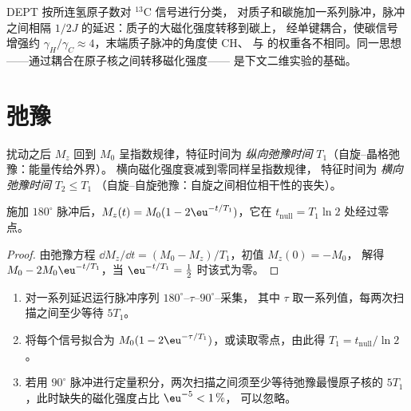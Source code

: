 DEPT 按所连氢原子数对 ${}^{13}$C 信号进行分类，
对质子和碳施加一系列脉冲，脉冲之间相隔
$1/2J$ 的延迟：质子的大磁化强度转移到碳上，
经单键耦合，使碳信号增强约
$\gamma_H/\gamma_C \approx 4$，末端质子脉冲的角度使 CH、 与
 的权重各不相同。同一思想——通过耦合在原子核之间转移磁化强度——
是下文二维实验的基础。

\section{弛豫}

\begin{definition}[纵向与横向弛豫时间]\label{def:b3:advanced-nmr:relaxation}
扰动之后 $M_z$ 回到 $M_0$ 呈指数规律，特征时间为
\emph{纵向弛豫时间} $T_1$（自旋–晶格弛豫：能量传给外界）。
横向磁化强度衰减到零同样呈指数规律，
特征时间为
\emph{横向弛豫时间} $T_2 \le T_1$
（自旋–自旋弛豫：自旋之间相位相干性的丧失）。
\end{definition}

\begin{proposition}[反转恢复]\label{prop:b3:advanced-nmr:inversion-recovery}
施加 $180^\circ$ 脉冲后，$M_z(t) = M_0(1 - 2\eu^{-t/T_1})$，它在
$t_{\mathrm{null}} = T_1\ln2$ 处经过零点。
\end{proposition}

\begin{proof}
由弛豫方程 $\dd M_z/\dd t = (M_0 - M_z)/T_1$，初值 $M_z(0) = -M_0$，
解得 $M_0 - 2M_0\eu^{-t/T_1}$，当 $\eu^{-t/T_1} = \frac12$ 时该式为零。
\end{proof}

\begin{method}[测量 $T_1$ 并设定定量循环延迟]\label{met:b3:advanced-nmr:t1}
\begin{enumerate}
  \item 对一系列延迟运行脉冲序列 $180^\circ$--$\tau$--$90^\circ$--采集，
        其中 $\tau$ 取一系列值，每两次扫描之间至少等待 $5T_1$。
  \item 将每个信号拟合为 $M_0(1 - 2\eu^{-\tau/T_1})$，或读取零点，由此得 $T_1 =
        t_{\mathrm{null}}/\ln2$。
  \item 若用 $90^\circ$ 脉冲进行定量积分，两次扫描之间须至少等待弛豫最慢原子核的
        $5T_1$，此时缺失的磁化强度占比 $\eu^{-5} < 1\,\%$，
        可以忽略。
\end{enumerate}
\end{method}

